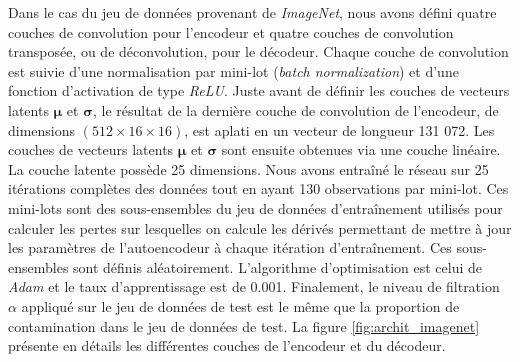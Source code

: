 Dans le cas du jeu de données provenant de \textit{ImageNet}, nous avons défini quatre couches de convolution pour l'encodeur et quatre couches de convolution transposée, ou de déconvolution, pour le décodeur. Chaque couche de convolution est suivie d'une normalisation par mini-lot (\textit{batch normalization}) et d'une fonction d'activation de type \textit{ReLU}. Juste avant de définir les couches de vecteurs latents $\boldsymbol{\mu}$ et $\boldsymbol{\sigma}$, le résultat de la dernière couche de convolution de l'encodeur, de dimensions $(512 \times 16 \times 16)$, est aplati en un vecteur de longueur 131 072. Les couches de vecteurs latents $\boldsymbol{\mu}$ et $\boldsymbol{\sigma}$ sont ensuite obtenues via une couche linéaire. La couche latente possède 25 dimensions. Nous avons entraîné le réseau sur 25 itérations complètes des données tout en ayant 130 observations par mini-lot. Ces mini-lots sont des 
sous-ensembles du jeu de données d'entraînement utilisés pour calculer les pertes sur lesquelles on calcule les dérivés permettant de mettre à jour les paramètres de l’autoencodeur à chaque itération d’entraînement. Ces sous-ensembles sont définis aléatoirement. L'algorithme d'optimisation est celui de \textit{Adam} \citep{kingma2014method} et le taux d'apprentissage est de 0.001. Finalement, le niveau de filtration $\alpha$ appliqué sur le jeu de données de test est le même que la proportion de contamination dans le jeu de données de test. La figure \ref{fig:archit_imagenet} présente en détails les différentes couches de l'encodeur et du décodeur.


